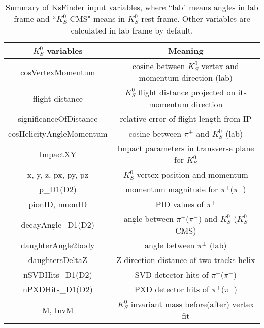 \begin{table}[htbp]
	\centering 
	\small
	\begin{tabular}{|c|c|} 
		\hline
		$K_S^0$ variables &  Meaning \\
		\hline
		{cosVertexMomentum} & cosine between $K_S^0$ vertex and momentum direction (lab)\\
		flight distance & $K_S^0$ flight distance projected on its momentum direction\\
		significanceOfDistance & relative error of flight length from IP\\
		cosHelicityAngleMomentum & cosine between $\pi^{\pm}$ and $K_S^0$ (lab)\\
		ImpactXY & Impact parameters in transverse plane for $K_S^0$\\
		x, y, z, px, py, pz & $K_S^0$ vertex position and momentum\\
		p\_D1(D2) & momentum magnitude for $\pi^+$($\pi^-$)\\
		pionID, muonID & PID values of $\pi^+$\\
		decayAngle\_D1(D2) & angle between $\pi^+$($\pi^-$) and $K_S^0$ ($K_S^0$ CMS)\\
		daughterAngle2body & angle between $\pi^{\pm}$ (lab)\\
		daughtersDeltaZ & Z-direction distance of two tracks helix\\
		nSVDHits\_D1(D2)& SVD detector hits of  $\pi^+$($\pi^-$) \\
		nPXDHits\_D1(D2)& PXD detector hits of  $\pi^+$($\pi^-$) \\
		M, InvM & $K_S^0$ invariant mass before(after) vertex fit\\
		\hline
	\end{tabular}
	\caption{\small Summary of KsFinder input variables, where ``lab" means angles in lab frame and  ``$K_S^0$ CMS" means in $K_S^0$ rest frame. Other variables are calculated in lab frame by default. }
	\label{tab:ks_vars}
\end{table}

